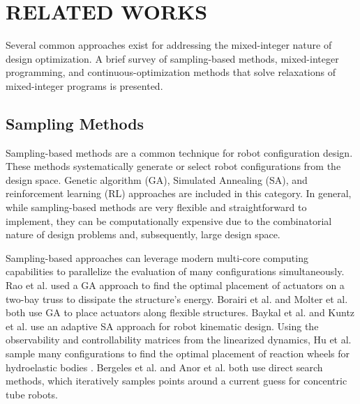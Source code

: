 \section{RELATED WORKS} \label{sec:capo:related_works}
Several common approaches exist for addressing the mixed-integer nature of design optimization. A brief survey of sampling-based methods, mixed-integer programming, and continuous-optimization methods that solve relaxations of mixed-integer programs is presented.
\subsection{Sampling Methods}
Sampling-based methods are a common technique for robot configuration design. These methods systematically generate or select robot configurations from the design space. Genetic algorithm (GA), Simulated Annealing (SA), and reinforcement learning (RL) approaches are included in this category. In general, while sampling-based methods are very flexible and straightforward to implement, they can be computationally expensive due to the combinatorial nature of design problems and, subsequently, large design space. 

Sampling-based approaches can leverage modern multi-core computing capabilities to parallelize the evaluation of many configurations simultaneously. Rao et al. \cite{Rao1991} used a GA approach to find the optimal placement of actuators on a two-bay truss to dissipate the structure's energy. Borairi et al. \cite{m_borairi_optimal_2017} and Molter et al. \cite{molter_simultaneous_2010} both use GA to place actuators along flexible structures. {Baykal et al. \cite{baykal_asymptotically_2019} and Kuntz et al. \cite{a_kuntz_kinematic_2018} use an adaptive SA approach for robot kinematic design. Using the observability and controllability matrices from the linearized dynamics, Hu et al. sample many configurations to find the optimal placement of reaction wheels for hydroelastic bodies \cite{hu_placement_2015}. Bergeles et al. \cite{c_bergeles_concentric_2015} and Anor et al. \cite{t_anor_algorithms_2011} both use direct search methods, which iteratively samples points around a current guess for concentric tube robots. }

